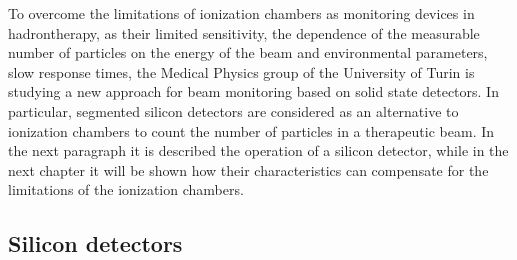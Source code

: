 \noindent To overcome the limitations of ionization chambers as monitoring devices in hadrontherapy, as their limited sensitivity, the dependence of the measurable number of particles on the energy of the beam and environmental parameters, slow response times, the Medical Physics group of the University of Turin is studying a new approach for beam monitoring based on solid state detectors.
In particular, segmented silicon detectors are considered as an alternative to ionization chambers to count the number of particles in a therapeutic beam.
\newline
In the next paragraph it is described the operation of a silicon detector, while in the next chapter it will be shown how their characteristics can compensate for the limitations of the ionization chambers.

\subsection{Silicon detectors}

